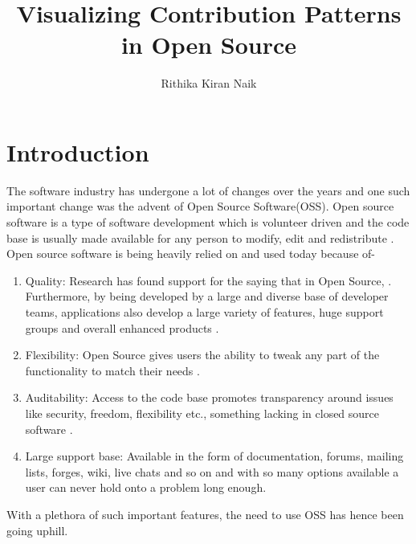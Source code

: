 \documentclass[seploa]{beavtex}
\title{Visualizing Contribution Patterns in Open Source}
\author{Rithika Kiran Naik}
\begin{document}
\maketitle

\mainmatter

\chapter{Introduction}
The software industry has undergone a lot of changes over the years and one such important change was the advent of Open Source Software(OSS). Open source software is a type of software development which is volunteer driven \cite{ghosh2005} and the code base is usually made available for any person to modify, edit and redistribute \cite{osdef}. Open source software is being heavily relied on and used today because of-
\begin{enumerate}
\item Quality: Research has found support for the saying that in Open Source,  \cite{linuslaw}. Furthermore, by being developed by a large and diverse base of developer teams, applications also develop a large variety of features, huge support groups and overall enhanced products \cite{pcwr}. 
\item Flexibility: Open Source gives users the ability to tweak any part of the functionality to
match their needs \cite{pcwr}. 
\item Auditability: Access to the code base promotes transparency around issues like security, freedom, flexibility etc., something lacking in closed source
software \cite{pcwr}. 
\item Large support base: Available in the form of documentation, forums, mailing lists, forges, wiki, live chats and so on and with so many options available a user can never hold onto a problem long enough. 
\end{enumerate}
With a plethora of such important features, the need to use OSS has hence been going uphill.
\end{document}
